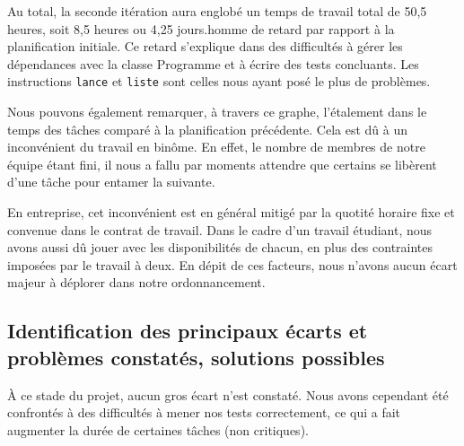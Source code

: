 \documentclass[12pt,a4paper,titlepage,openany, oneside]{report}
\begin{document}
    Au total, la seconde itération aura englobé un temps de travail total de 50,5 heures,
    soit 8,5 heures ou 4,25 jours.homme de retard par rapport à la planification initiale. Ce
    retard s'explique dans des difficultés à gérer les dépendances avec la classe Programme
    et à écrire des tests concluants. Les instructions \verb|lance| et \verb|liste| sont
    celles nous ayant posé le plus de problèmes.

    Nous pouvons également remarquer, à travers ce graphe, l'étalement dans le temps
    des tâches comparé à la planification précédente. Cela est dû à un inconvénient du
    travail en binôme. En effet, le nombre de membres de notre équipe étant fini, il nous
    a fallu par moments attendre que certains se libèrent d'une tâche pour entamer la
    suivante.

    En entreprise, cet inconvénient est en général mitigé par la quotité horaire
    fixe et convenue dans le contrat de travail. Dans le cadre d'un travail étudiant, nous
    avons aussi dû jouer avec les disponibilités de chacun, en plus des contraintes
    imposées par le travail à deux. En dépit de ces facteurs, nous n'avons aucun écart
    majeur à déplorer dans notre ordonnancement.




    \subsection{Identification des principaux écarts et problèmes constatés, solutions possibles}
        \`{A} ce stade du projet, aucun gros écart n'est constaté. Nous avons cependant
        été confrontés à des difficultés à mener nos tests correctement, ce qui a fait
        augmenter la durée de certaines tâches (non critiques).
\end{document}
